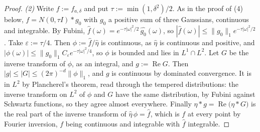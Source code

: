 \begin{proof}
\emph{(2)} Write $f := f_{a,\delta}$ and put $\tau := \min(1, \delta^2)/2$. As in the proof of (4)
below, $f = N(0, \tau I) * g_0$ with $g_0$ a positive sum of three Gaussians, continuous and
integrable. By Fubini, $\widehat f(\omega) = e^{-\tau|\omega|^2/2}\,\widehat{g_0}(\omega)$, so
$|\widehat f(\omega)| \le \|g_0\|_1e^{-\tau|\omega|^2/2}$. Take $\varepsilon := \tau/4$. Then
$\phi := \widehat f/\widehat\eta$ is continuous, as $\widehat\eta$ is continuous and positive, and
$|\phi(\omega)| \le \|g_0\|_1C_\varepsilon e^{-\tau|\omega|^2/4}$, so $\phi$ is bounded and lies in
$L^1 \cap L^2$. Let $G$ be the inverse transform of $\phi$, as an integral, and
$g := \operatorname{Re}G$. Then $|g| \le |G| \le (2\pi)^{-d}\|\phi\|_1$, and $g$ is continuous by
dominated convergence. It is in $L^2$ by Plancherel's theorem, read through the tempered
distributions: the inverse transform on $L^2$ of $\phi$ and $G$ have the same distribution, by
Fubini against Schwartz functions, so they agree almost everywhere. Finally
$\eta * g = \operatorname{Re}\bigl(\eta * G\bigr)$ is the real part of the inverse transform of
$\widehat\eta\,\phi = \widehat f$, which is $f$ at every point by Fourier inversion, $f$ being
continuous and integrable with $\widehat f$ integrable.


\end{proof}
